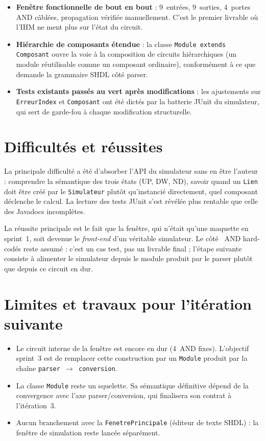 \documentclass[11pt,a4paper]{article}
\begin{document}
\begin{itemize}
  \item \textbf{Fen\^etre fonctionnelle de bout en bout} : 9~entr\'ees, 9~sorties, 4~portes AND c\^abl\'ees, propagation v\'erifi\'ee manuellement. C'est le premier livrable o\`u l'IHM ne ment plus sur l'\'etat du circuit.
  \item \textbf{Hi\'erarchie de composants \'etendue} : la classe \texttt{Module extends Composant} ouvre la voie \`a la composition de circuits hi\'erarchiques (un module r\'eutilisable comme un composant ordinaire), conform\'ement \`a ce que demande la grammaire SHDL c\^ot\'e parser.
  \item \textbf{Tests existants pass\'es au vert apr\`es modifications} : les ajustements sur \texttt{ErreurIndex} et \texttt{Composant} ont \'et\'e dict\'es par la batterie JUnit du simulateur, qui sert de garde-fou \`a chaque modification structurelle.
\end{itemize}

\section*{Difficult\'es et r\'eussites}

La principale difficult\'e a \'et\'e d'absorber l'API du simulateur sans en \^etre l'auteur : comprendre la s\'emantique des trois \'etats (UP, DW, ND), savoir quand un \texttt{Lien} doit \^etre cr\'e\'e par le \texttt{Simulateur} plut\^ot qu'instanci\'e directement, quel composant d\'eclenche le calcul. La lecture des tests JUnit s'est r\'ev\'el\'ee plus rentable que celle des Javadocs incompl\`etes.

La r\'eussite principale est le fait que la fen\^etre, qui n'\'etait qu'une maquette en sprint~1, soit devenue le \emph{front-end} d'un v\'eritable simulateur. Le c\^ot\'e ~AND hard-cod\'es \fg{} reste assum\'e : c'est un cas test, pas un livrable final ; l'\'etape suivante consiste \`a alimenter le simulateur depuis le module produit par le parser plut\^ot que depuis ce circuit en dur.

\section*{Limites et travaux pour l'it\'eration suivante}

\begin{itemize}
  \item Le circuit interne de la fen\^etre est encore \og en dur \fg{} (4~AND fixes). L'objectif sprint~3 est de remplacer cette construction par un \texttt{Module} produit par la cha\^ine \texttt{parser \(\to\) conversion}.
  \item La classe \texttt{Module} reste un squelette. Sa s\'emantique d\'efinitive d\'epend de la conver\-gence avec l'axe parser/conversion, qui finalisera son contrat \`a l'it\'eration~3.
  \item Aucun branchement avec la \texttt{FenetrePrincipale} (\'editeur de texte SHDL) : la fen\^etre de simulation reste lanc\'ee s\'epar\'ement.
\end{itemize}
\end{document}
